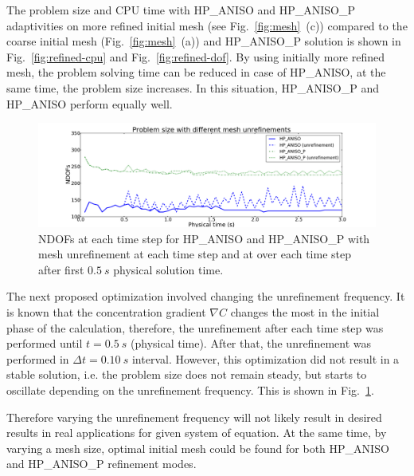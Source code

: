 The problem size and CPU time with HP\_ANISO
and HP\_ANISO\_P adaptivities on more refined initial mesh (see Fig.~\ref{fig:mesh}~(c))
compared to the coarse initial mesh (Fig.~\ref{fig:mesh}~(a)) and 
HP\_ANISO\_P solution is shown in Fig.~\ref{fig:refined-cpu} and Fig.~\ref{fig:refined-dof}.
By using initially more refined mesh, the problem solving time
can be reduced in case of HP\_ANISO, at the same time, the problem size increases.
In this situation, HP\_ANISO\_P and HP\_ANISO perform equally well.

\begin{figure}
  \begin{centering}
  \includegraphics[width=\columnwidth]{unreffreq_dof}
  \caption{\label{fig:unreffreq-dof} NDOFs at each time step for
  HP\_ANISO and HP\_ANISO\_P with mesh unrefinement at each time step and at over each
  	time step after first $0.5\ s$ physical solution time.}
  \end{centering}
\end{figure}
The next proposed optimization involved changing the unrefinement frequency.
It is known that the concentration gradient $\nabla C$ changes the most in the initial phase
of the calculation, therefore, the unrefinement after each time step was performed
until $t=0.5\ s$ (physical time). After that, the
unrefinement was performed in $\Delta t = 0.10\ s$ interval.
However, this optimization did not result in a stable solution, i.e. the problem size 
does not remain steady, but starts to oscillate depending on the unrefinement
frequency. This is shown in 
Fig.~\ref{fig:unreffreq-dof}. 

Therefore varying the unrefinement frequency will
not likely result in desired results in real applications for given system of equation.
At the same time, by varying a mesh size, optimal initial mesh could be found
for both HP\_ANISO and HP\_ANISO\_P refinement modes.
	 
